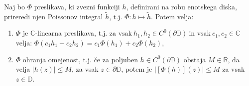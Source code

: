 \documentclass[mat1]{fmfdelo}
\begin{document}
     \begin{trditev}
        \label{lastpi}
        Naj bo $\Phi$ preslikava, ki zvezni funkciji $h$, definirani na robu enotskega diska, prireredi njen Poissonov integral $\widetilde{h}$, t.j. $\Phi : h \mapsto \widetilde{h}$.
        Potem velja:
        \begin{enumerate}[label={\alph*)}]
            \item $\Phi$ je $\mathbb{C}$-linearna preslikava, t.j. \mbox{$\text{za vsak}~h_1,h_2 \in C^0(\partial \mathbb{D})~\text{in vsak}~c_1,c_2 \in \mathbb{C}$} velja: $\Phi(c_1 h_1 + c_2 h_2) = c_1 \Phi(h_1) + c_2 \Phi(h_2)$,
            \item $\Phi$ ohranja omejenost, t.j. če za poljuben $h \in C^0(\partial \mathbb{D})$ obstaja $M \in \mathbb{R}$, da velja $|h(z)| \leq M$, za vsak $z \in \partial \mathbb{D}$, potem je $|[\Phi(h)](z)| \leq M$ za vsak $z \in \mathbb{D}$.
        \end{enumerate}
     \end{trditev}
\end{document}
